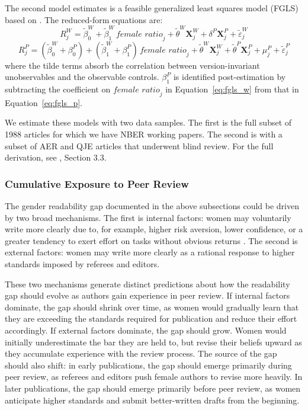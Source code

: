 The second model \textcite{hengel2022publishing} estimates is a feasible generalized least squares model (FGLS) based on \textcite{ashenfelter1994estimates}. The reduced-form equations are:
\begin{equation}
R_j^W = \tilde{\beta}_0^W + \tilde{\beta}_1^W \, \textit{female ratio}_j + \tilde{\theta}^W \mathbf{X}_j^W + \delta^P \mathbf{X}_j^P + \tilde{\varepsilon}_j^W
\label{eq:fgls_w}\end{equation}
\begin{equation}
R_j^P = (\tilde{\beta}_0^W + \beta_0^P) + (\tilde{\beta}_1^W + \beta_1^P) \, \textit{female ratio}_j + \tilde{\theta}^W \mathbf{X}_j^W + \tilde{\theta}^P \mathbf{X}_j^P + \mu_j^P + \tilde{\varepsilon}_j^P
\label{eq:fgls_p}\end{equation}
where the tilde terms absorb the correlation between version-invariant unobservables and the observable controls. $\beta_1^P$ is identified post-estimation by subtracting the coefficient on $\textit{female ratio}_j$ in Equation~\eqref{eq:fgls_w} from that in Equation~\eqref{eq:fgls_p}. 

We estimate these models with two data samples. The first is the full subset of 1988 articles for which we have NBER working papers. The second is with a subset of AER and QJE articles that underwent blind review. For the full derivation, see \textcite{hengel2022publishing}, Section 3.3.

\subsubsection{Cumulative Exposure to Peer Review}\label{sec:Exposure_Method}

The gender readability gap documented in the above subsections could be driven by two broad mechanisms. The first is internal factors: women may voluntarily write more clearly due to, for example, higher risk aversion, lower confidence, or a greater tendency to exert effort on tasks without obvious returns \parencite{crosongneezy2009, coffman2014, babcock2017}. The second is external factors: women may write more clearly as a rational response to higher standards imposed by referees and editors.

These two mechanisms generate distinct predictions about how the readability gap should evolve as authors gain experience in peer review. If internal factors dominate, the gap should shrink over time, as women would gradually learn that they are exceeding the standards required for publication and reduce their effort accordingly. If external factors dominate, the gap should grow. Women would initially underestimate the bar they are held to, but revise their beliefs upward as they accumulate experience with the review process. The source of the gap should also shift: in early publications, the gap should emerge primarily during peer review, as referees and editors push female authors to revise more heavily. In later publications, the gap should emerge primarily before peer review, as women anticipate higher standards and submit better-written drafts from the beginning.

